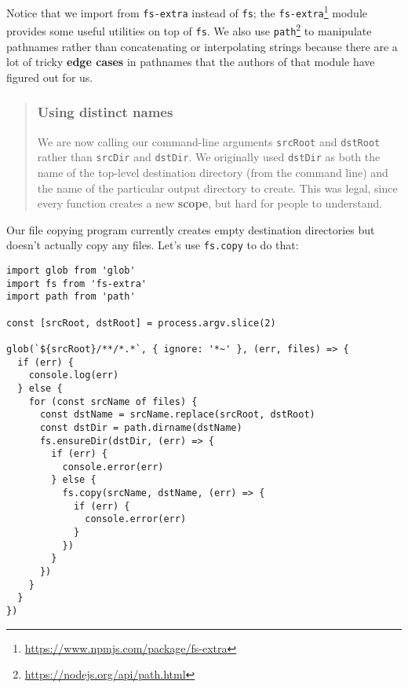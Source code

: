 \documentclass[krantzl]{krantz}
\newcommand{\glossref}[1]{\textbf{#1}}
\newenvironment{callout}{\savenotes\begin{tBox}\begin{quotation}\toggletrue{inbox}\renewcommand{\thempfootnote}{\arabic{footnote}}}{\end{quotation}\vspace{\baselineskip}\end{tBox}\togglefalse{inbox}\spewnotes}
\newcommand{\hreffoot}[2]{{#1}\footnote{\href{#2}{#2}}}
\begin{document}
Notice that we import from \texttt{fs-extra} instead of \texttt{fs};
the \hreffoot{\texttt{fs-extra}}{https://www.npmjs.com/package/fs-extra} module provides some useful utilities on top of \texttt{fs}.
We also use \hreffoot{\texttt{path}}{https://nodejs.org/api/path.html} to manipulate pathnames
rather than concatenating or interpolating strings
because there are a lot of tricky \glossref{edge cases} in pathnames
that the authors of that module have figured out for us.

\begin{callout}


\subsubsection*{Using distinct names}


We are now calling our command-line arguments \texttt{srcRoot} and \texttt{dstRoot}
rather than \texttt{srcDir} and \texttt{dstDir}.
We originally used \texttt{dstDir} as both
the name of the top-level destination directory (from the command line)
and the name of the particular output directory to create.
This was legal,
since every function creates
a new \glossref{scope},
but hard for people to understand.

\end{callout}


Our file copying program currently creates empty destination directories
but doesn't actually copy any files.
Let's use \texttt{fs.copy} to do that:


\begin{lstlisting}[frame=single,frameround=tttt]
import glob from 'glob'
import fs from 'fs-extra'
import path from 'path'

const [srcRoot, dstRoot] = process.argv.slice(2)

glob(`${srcRoot}/**/*.*`, { ignore: '*~' }, (err, files) => {
  if (err) {
    console.log(err)
  } else {
    for (const srcName of files) {
      const dstName = srcName.replace(srcRoot, dstRoot)
      const dstDir = path.dirname(dstName)
      fs.ensureDir(dstDir, (err) => {
        if (err) {
          console.error(err)
        } else {
          fs.copy(srcName, dstName, (err) => {
            if (err) {
              console.error(err)
            }
          })
        }
      })
    }
  }
})
\end{lstlisting}
\end{document}
